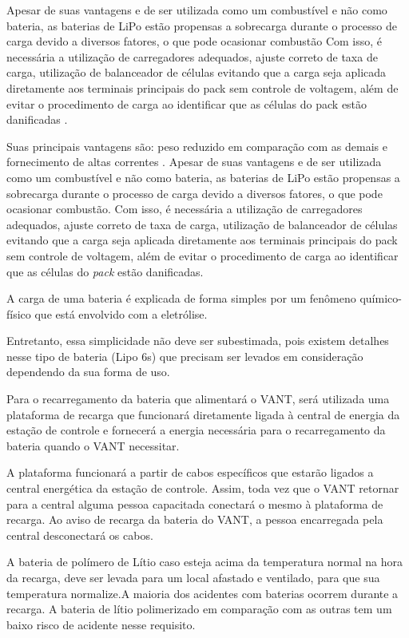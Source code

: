 Apesar de suas vantagens e de ser utilizada como um combustível e não como bateria, as baterias de LiPo estão propensas a sobrecarga durante o processo de carga devido a diversos fatores, o que pode ocasionar combustão Com isso, é necessária a utilização de carregadores adequados, ajuste correto de taxa de carga, utilização de balanceador de células evitando que a carga seja aplicada diretamente aos terminais principais do pack sem controle de voltagem, além de evitar o procedimento de carga ao identificar que as células do pack estão danificadas \cite{gibbs}.

Suas principais vantagens são: peso reduzido em comparação com as demais e fornecimento de altas correntes 
\cite{pinto}. Apesar de suas vantagens e de ser utilizada como um combustível e não como bateria,
as baterias de LiPo estão propensas a sobrecarga durante o processo de carga devido a diversos fatores, 
o que pode ocasionar combustão. Com isso, é necessária a utilização de carregadores adequados, ajuste correto 
de taxa de carga, utilização de balanceador de células evitando que a carga seja aplicada diretamente aos 
terminais principais do pack sem controle de voltagem, além de evitar o procedimento de carga ao identificar 
que as células do \textit{pack} estão danificadas. \cite{gibbs}


A carga de uma bateria é explicada de forma simples por um fenômeno químico-físico que está envolvido com a eletrólise. \cite{gibbs}

Entretanto, essa simplicidade não deve ser subestimada, pois existem detalhes nesse tipo de bateria (Lipo 6s) que precisam ser levados em consideração dependendo da sua forma de uso.

Para o recarregamento da bateria que alimentará o VANT, será utilizada uma plataforma de recarga que funcionará diretamente ligada à  central de energia da estação de controle e fornecerá a energia necessária para o recarregamento da bateria quando o VANT necessitar.

A plataforma funcionará a partir de cabos específicos que estarão ligados a central energética da estação de controle. Assim, toda vez que o VANT retornar para a central alguma pessoa capacitada conectará o mesmo à plataforma de recarga. Ao aviso de recarga da bateria do VANT, a pessoa encarregada pela central desconectará os cabos.

A bateria de polímero de Lítio caso esteja acima da temperatura normal na hora da recarga, deve ser levada para um local afastado e ventilado, para que sua temperatura normalize.A maioria dos acidentes com baterias ocorrem durante a recarga. A bateria de lítio polimerizado em comparação com as outras tem um baixo risco de acidente nesse requisito. \cite{gibbs}

